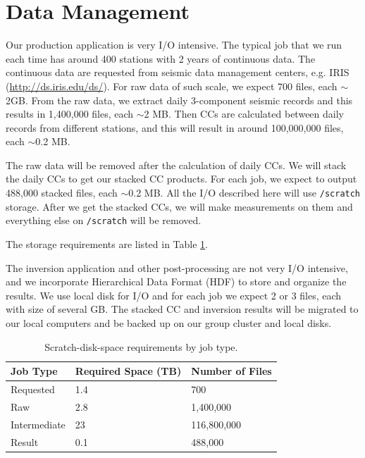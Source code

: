 \documentclass[10pt, letterpaper]{article}
\begin{document}
\section{Data Management}\label{sec:IO}
Our production application is very I/O intensive. The typical job that we run each time has around 400 stations with 2 years of continuous data. The continuous data are requested from seismic data management centers, e.g. IRIS (\url{http://ds.iris.edu/ds/}). For raw data of such scale, we expect 700 files, each $\sim$2GB. From the raw data, we extract daily 3-component seismic records and this results in 1,400,000 files, each $\sim$2 MB.
Then CCs are calculated between daily records from different stations, and this will result in around 100,000,000 files, each $\sim$0.2 MB.

The raw data will be removed after the calculation of daily CCs. We will stack the daily CCs to get our stacked CC products. For each job, we expect to output 488,000 stacked files, each $\sim$0.2 MB. All the I/O described here will use \lstinline{/scratch} storage. After we get the stacked CCs, we will make measurements on them and everything else on \lstinline{/scratch} will be removed.

The storage requirements are listed in Table \ref{tab:space}.

The inversion application and other post-processing are not very I/O intensive, and we incorporate Hierarchical Data Format (HDF) to store and organize the results. We use local disk for I/O and for each job we expect 2 or 3 files, each with size of several GB. The stacked CC and inversion results will be migrated to our local computers and be backed up on our group cluster and local disks.

\begin{table}[h]
\centering
\begin{tabular}{| l | l | l |}
\hline
  Job Type            & Required Space (TB) & Number of Files  \\ \hline
  Requested           & 1.4                 & 700   \\
  Raw                 & 2.8                 & 1,400,000   \\
  Intermediate        & 23                  & 116,800,000 \\
  Result              & 0.1                 & 488,000 \\
\hline
\end{tabular}
\caption{\label{tab:space}Scratch-disk-space requirements by job type.}
\end{table}

\end{document}
